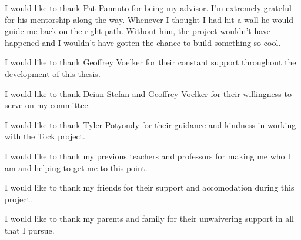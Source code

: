\documentclass[12pt]{ucsddissertation}
\begin{document}

\begin{acknowledgements}
\noindent
I would like to thank Pat Pannuto for being my advisor. I'm extremely grateful for his mentorship along the way. Whenever I thought I had hit a wall he would guide me back on the right path. Without him, the project wouldn't have happened and I wouldn't have gotten the chance to build something so cool.

\noindent
I would like to thank Geoffrey Voelker for their constant support throughout the development of this thesis. 

\noindent
I would like to thank Deian Stefan and Geoffrey Voelker for their willingness to serve on my committee.

\noindent
I would like to thank Tyler Potyondy for their guidance and kindness in working with the Tock project.  

\noindent
I would like to thank my previous teachers and professors for making me who I am and helping to get me to this point.

\noindent
I would like to thank my friends for their support and accomodation during this project.

\noindent
I would like to thank my parents and family for their unwaivering support in all that I pursue.
\end{acknowledgements}
\end{document}

